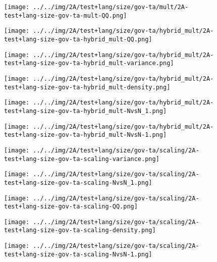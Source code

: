 \begin{figure}[H]
\centering	\texttt{[image: ../../img/2A/test+lang/size/gov-ta/mult/2A-test+lang-size-gov-ta-mult-QQ.png]}
\end{figure}
\begin{figure}[H]
\centering	\texttt{[image: ../../img/2A/test+lang/size/gov-ta/hybrid\_mult/2A-test+lang-size-gov-ta-hybrid\_mult-QQ.png]}
\end{figure}
\begin{figure}[H]
\centering	\texttt{[image: ../../img/2A/test+lang/size/gov-ta/hybrid\_mult/2A-test+lang-size-gov-ta-hybrid\_mult-variance.png]}
\end{figure}
\begin{figure}[H]
\centering	\texttt{[image: ../../img/2A/test+lang/size/gov-ta/hybrid\_mult/2A-test+lang-size-gov-ta-hybrid\_mult-density.png]}
\end{figure}
\begin{figure}[H]
\centering	\texttt{[image: ../../img/2A/test+lang/size/gov-ta/hybrid\_mult/2A-test+lang-size-gov-ta-hybrid\_mult-NvsN\_1.png]}
\end{figure}
\begin{figure}[H]
\centering	\texttt{[image: ../../img/2A/test+lang/size/gov-ta/hybrid\_mult/2A-test+lang-size-gov-ta-hybrid\_mult-NvsN-1.png]}
\end{figure}
\begin{figure}[H]
\centering	\texttt{[image: ../../img/2A/test+lang/size/gov-ta/scaling/2A-test+lang-size-gov-ta-scaling-variance.png]}
\end{figure}
\begin{figure}[H]
\centering	\texttt{[image: ../../img/2A/test+lang/size/gov-ta/scaling/2A-test+lang-size-gov-ta-scaling-NvsN\_1.png]}
\end{figure}
\begin{figure}[H]
\centering	\texttt{[image: ../../img/2A/test+lang/size/gov-ta/scaling/2A-test+lang-size-gov-ta-scaling-QQ.png]}
\end{figure}
\begin{figure}[H]
\centering	\texttt{[image: ../../img/2A/test+lang/size/gov-ta/scaling/2A-test+lang-size-gov-ta-scaling-density.png]}
\end{figure}
\begin{figure}[H]
\centering	\texttt{[image: ../../img/2A/test+lang/size/gov-ta/scaling/2A-test+lang-size-gov-ta-scaling-NvsN-1.png]}
\end{figure}

